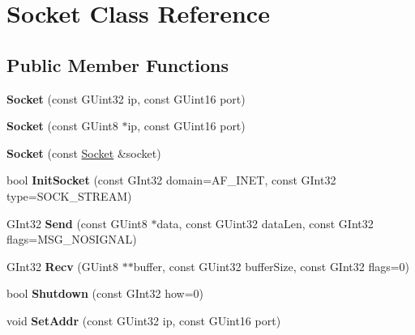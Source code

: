 \hypertarget{class_socket}{\section{Socket Class Reference}
\label{class_socket}
}
\subsection*{Public Member Functions}
\begin{DoxyCompactItemize}
\item 
\hypertarget{class_socket_abf07ad463fdba77fbf73d1cd79065fe5}{{\bfseries Socket} (const G\-Uint32 ip, const G\-Uint16 port)}\label{class_socket_abf07ad463fdba77fbf73d1cd79065fe5}

\item 
\hypertarget{class_socket_a152fea9c81716bc8c524b20b485d30a7}{{\bfseries Socket} (const G\-Uint8 $\ast$ip, const G\-Uint16 port)}\label{class_socket_a152fea9c81716bc8c524b20b485d30a7}

\item 
\hypertarget{class_socket_ad55073e6cf9e64bd24a4b3f2add476bd}{{\bfseries Socket} (const \hyperlink{class_socket}{Socket} \&socket)}\label{class_socket_ad55073e6cf9e64bd24a4b3f2add476bd}

\item 
\hypertarget{class_socket_acfbacd9dd69eee48a59f54d883f26736}{bool {\bfseries Init\-Socket} (const G\-Int32 domain=A\-F\-\_\-\-I\-N\-E\-T, const G\-Int32 type=S\-O\-C\-K\-\_\-\-S\-T\-R\-E\-A\-M)}\label{class_socket_acfbacd9dd69eee48a59f54d883f26736}

\item 
\hypertarget{class_socket_ae259170ccc2566cee87c1717193ee70a}{G\-Int32 {\bfseries Send} (const G\-Uint8 $\ast$data, const G\-Uint32 data\-Len, const G\-Int32 flags=M\-S\-G\-\_\-\-N\-O\-S\-I\-G\-N\-A\-L)}\label{class_socket_ae259170ccc2566cee87c1717193ee70a}

\item 
\hypertarget{class_socket_a60d3d9831ebb40d44c7d768caf613ebc}{G\-Int32 {\bfseries Recv} (G\-Uint8 $\ast$$\ast$buffer, const G\-Uint32 buffer\-Size, const G\-Int32 flags=0)}\label{class_socket_a60d3d9831ebb40d44c7d768caf613ebc}

\item 
\hypertarget{class_socket_af53204aacda49c484d2c085c28bb9d7d}{bool {\bfseries Shutdown} (const G\-Int32 how=0)}\label{class_socket_af53204aacda49c484d2c085c28bb9d7d}

\item 
\hypertarget{class_socket_a8b2e54d77ae9e384bb61ae2d0e2f642a}{void {\bfseries Set\-Addr} (const G\-Uint32 ip, const G\-Uint16 port)}\label{class_socket_a8b2e54d77ae9e384bb61ae2d0e2f642a}


\end{DoxyCompactItemize}
